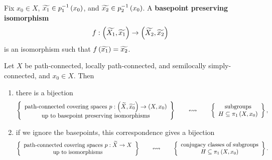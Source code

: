 \pagebreak


Fix $ x_0 \in X $, $ \widetilde{x_1} \in p_1^{-1}\left( x_0 \right) $, and $ \widetilde{x_2} \in p_2^{-1}\left( x_0 \right) $. A \textbf{basepoint preserving isomorphism}
$$ f : \left( \widetilde{X_1}, \widetilde{x_1} \right) \to \left( \widetilde{X_2}, \widetilde{x_2} \right) $$
is an isomorphism such that $ f\left( \widetilde{x_1} \right) = \widetilde{x_2} $.

\begin{theorem}
Let $ X $ be path-connected, locally path-connected, and semilocally simply-connected, and $ x_0 \in X $. Then
\begin{enumerate}
\item there is a bijection
$$ \left\{  \begin{array}{c} \text{path-connected covering spaces} \ p : \left( \widetilde{X}, \widetilde{x_0} \right) \to \left( X, x_0 \right) \\ \text{up to basepoint preserving isomorphisms} \end{array}  \right\} \qquad \leftrightsquigarrow \qquad \left\{  \begin{array}{c} \text{subgroups} \\ H \subseteq \pi_1\left( X, x_0 \right) \end{array}  \right\}, $$
\item if we ignore the basepoints, this correspondence gives a bijection
$$ \left\{  \begin{array}{c} \text{path-connected covering spaces} \ p : \widetilde{X} \to X \\ \text{up to isomorphisms} \end{array}  \right\} \qquad \leftrightsquigarrow \qquad \left\{  \begin{array}{c} \text{conjugacy classes of subgroups} \\ H \subseteq \pi_1\left( X, x_0 \right) \end{array}  \right\}. $$
\end{enumerate}
\end{theorem}

